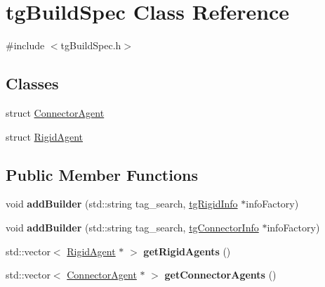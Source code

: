 \hypertarget{classtg_build_spec}{\section{tg\-Build\-Spec Class Reference}
\label{classtg_build_spec}
}


{\ttfamily \#include $<$tg\-Build\-Spec.\-h$>$}

\subsection*{Classes}
\begin{DoxyCompactItemize}
\item 
struct \hyperlink{structtg_build_spec_1_1_connector_agent}{Connector\-Agent}
\item 
struct \hyperlink{structtg_build_spec_1_1_rigid_agent}{Rigid\-Agent}
\end{DoxyCompactItemize}
\subsection*{Public Member Functions}
\begin{DoxyCompactItemize}
\item 
\hypertarget{classtg_build_spec_afd54d8bab0a9bc84d4900be145a7203e}{void {\bfseries add\-Builder} (std\-::string tag\-\_\-search, \hyperlink{classtg_rigid_info}{tg\-Rigid\-Info} $\ast$info\-Factory)}\label{classtg_build_spec_afd54d8bab0a9bc84d4900be145a7203e}

\item 
\hypertarget{classtg_build_spec_ac638cfc86ea908f5fd476ad22205426e}{void {\bfseries add\-Builder} (std\-::string tag\-\_\-search, \hyperlink{classtg_connector_info}{tg\-Connector\-Info} $\ast$info\-Factory)}\label{classtg_build_spec_ac638cfc86ea908f5fd476ad22205426e}

\item 
\hypertarget{classtg_build_spec_a8ef9c22ea03708a690d69c3ce91f91a2}{std\-::vector$<$ \hyperlink{structtg_build_spec_1_1_rigid_agent}{Rigid\-Agent} $\ast$ $>$ {\bfseries get\-Rigid\-Agents} ()}\label{classtg_build_spec_a8ef9c22ea03708a690d69c3ce91f91a2}

\item 
\hypertarget{classtg_build_spec_a4bdccb72f531b3a736e4c1f38ef6a7bf}{std\-::vector$<$ \hyperlink{structtg_build_spec_1_1_connector_agent}{Connector\-Agent} $\ast$ $>$ {\bfseries get\-Connector\-Agents} ()}\label{classtg_build_spec_a4bdccb72f531b3a736e4c1f38ef6a7bf}

\end{DoxyCompactItemize}



